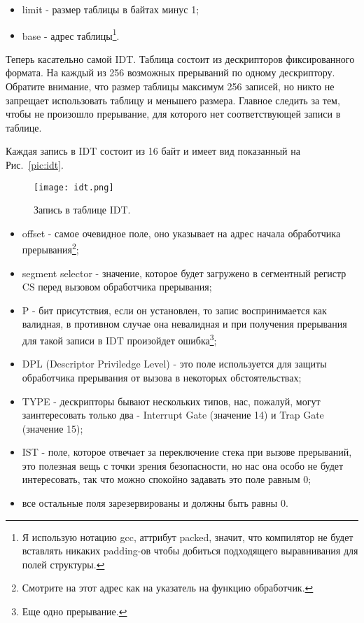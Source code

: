 \begin{itemize}
  \item limit - размер таблицы в байтах минус 1;
  \item base - адрес таблицы\footnote{Я использую нотацию gcc, аттрибут packed,
значит, что компилятор не будет вставлять никаких padding-ов чтобы добиться
подходящего выравнивания для полей структуры.}.
\end{itemize}

Теперь касательно самой IDT. Таблица состоит из дескрипторов фиксированного
формата. На каждый из 256 возможных прерываний по одному дескриптору. Обратите
внимание, что размер таблицы максимум 256 записей, но никто не запрещает
использовать таблицу и меньшего размера. Главное следить за тем, чтобы не
произошло прерывание, для которого нет соответствующей записи в таблице.

Каждая запись в IDT состоит из 16 байт и имеет вид показанный на
Рис.~\ref{pic:idt}.

\begin{figure}
  \centering
  \texttt{[image: idt.png]}
  \caption{Запись в таблице IDT.}
  \label{fig:idt}
\end{figure}

\begin{itemize}
  \item offset - самое очевидное поле, оно указывает на адрес начала обработчика
  прерывания\footnote{Смотрите на этот адрес как на указатель на функцию
  обработчик.};
  \item segment selector - значение, которое будет загружено в сегментный
  регистр CS перед вызовом обработчика прерывания;
  \item P - бит присутствия, если он установлен, то запис воспринимается как
  валидная, в противном случае она невалидная и при получения прерывания для
  такой записи в IDT произойдет ошибка\footnote{Еще одно прерывание.};
  \item DPL (Descriptor Priviledge Level) - это поле используется для защиты
  обработчика прерывания от вызова в некоторых обстоятельствах;
  \item TYPE - дескрипторы бывают нескольких типов, нас, пожалуй, могут
  заинтересовать только два - Interrupt Gate (значение 14) и Trap Gate (значение
  15);
  \item IST - поле, которое отвечает за переключение стека при вызове
  прерываний, это полезная вещь с точки зрения безопасности, но нас она особо не
  будет интересовать, так что можно спокойно задавать это поле равным 0;
  \item все остальные поля зарезервированы и должны быть равны 0.
\end{itemize}


